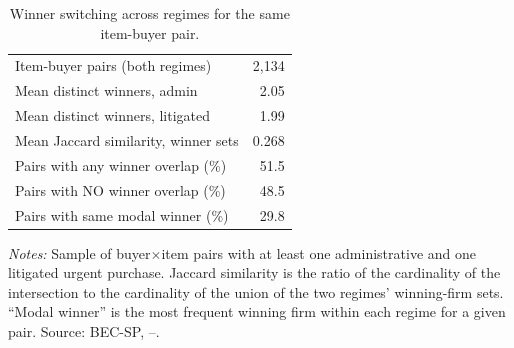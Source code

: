 \begin{table}[ht]
\centering
\caption{Winner switching across regimes for the same item-buyer pair.}
\label{tab:winner_switch}
\begin{threeparttable}
\begin{tabular}{lr}
\toprule
Item-buyer pairs (both regimes) & 2,134 \\
Mean distinct winners, admin & 2.05 \\
Mean distinct winners, litigated & 1.99 \\
Mean Jaccard similarity, winner sets & 0.268 \\
Pairs with any winner overlap (\%) & 51.5 \\
Pairs with NO winner overlap (\%) & 48.5 \\
Pairs with same modal winner (\%) & 29.8 \\
\midrule
\bottomrule
\end{tabular}
\begin{tablenotes}[flushleft]\footnotesize
\item \textit{Notes:} Sample of buyer$\times$item pairs with at least one administrative and one litigated urgent purchase. Jaccard similarity is the ratio of the cardinality of the intersection to the cardinality of the union of the two regimes' winning-firm sets. ``Modal winner'' is the most frequent winning firm within each regime for a given pair. Source: BEC-SP, \BPsampleStartYear--\BPsampleEndYear.
\end{tablenotes}
\end{threeparttable}
\end{table}

